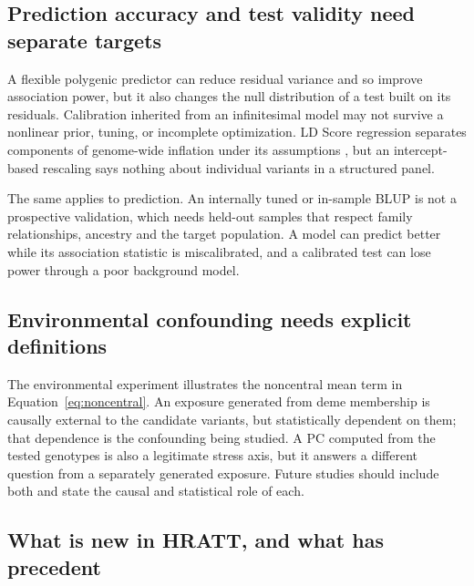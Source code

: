 \documentclass[11pt]{article}
\begin{document}
\subsection{Prediction accuracy and test validity need separate targets}

A flexible polygenic predictor can reduce residual variance and so
improve association power, but it also changes the null distribution of a
test built on its residuals. Calibration inherited from an infinitesimal
model may not survive a nonlinear prior, tuning, or incomplete
optimization. LD Score regression separates components of genome-wide
inflation under its assumptions \citep{bulikSullivan2015}, but an
intercept-based rescaling says nothing about individual variants in a
structured panel.

The same applies to prediction. An internally tuned or in-sample BLUP is
not a prospective validation, which needs held-out samples that respect
family relationships, ancestry and the target population. A model can
predict better while its association statistic is miscalibrated, and a
calibrated test can lose power through a poor background model.

\subsection{Environmental confounding needs explicit definitions}

The environmental experiment illustrates the noncentral mean term in
Equation~\eqref{eq:noncentral}. An exposure generated from deme membership
is causally external to the candidate variants, but statistically
dependent on them; that dependence is the confounding being studied. A PC
computed from the tested genotypes is also a legitimate stress axis, but
it answers a different question from a separately generated exposure.
Future studies should include both and state the causal and statistical
role of each.

\subsection{What is new in HRATT, and what has precedent}
\label{sec:novelty}
\end{document}
